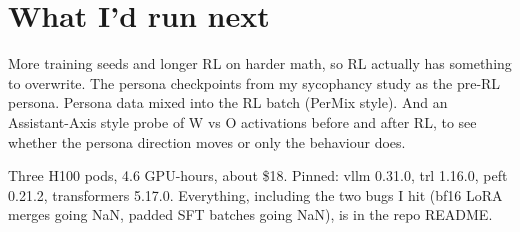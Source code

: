 \documentclass[10pt]{article}
\begin{document}
\section{What I'd run next}
More training seeds and longer RL on harder math, so RL actually has something to overwrite. The persona checkpoints from my sycophancy study as the pre-RL persona. Persona data mixed into the RL batch (PerMix style). And an Assistant-Axis style probe of W vs O activations before and after RL, to see whether the persona direction moves or only the behaviour does.

\vspace{4pt}
{\small Three H100 pods, 4.6 GPU-hours, about \$18. Pinned: vllm 0.31.0, trl 1.16.0, peft 0.21.2, transformers 5.17.0. Everything, including the two bugs I hit (bf16 LoRA merges going NaN, padded SFT batches going NaN), is in the repo README.}
\end{document}
